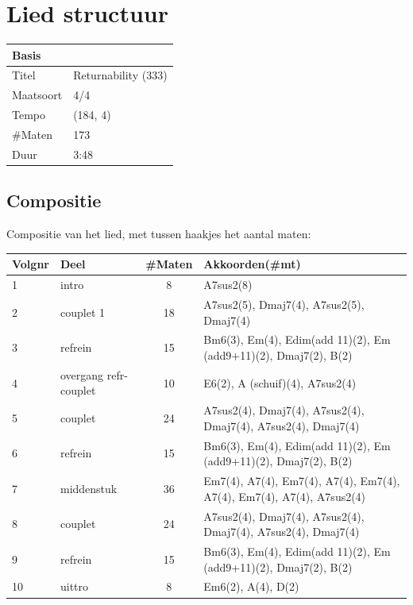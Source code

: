 \documentclass[a4paper,11pt]{article}
\begin{document}
\section*{Lied structuur}

\begin{tabular}{ll}
\hline
\textbf{Basis} & \\
\hline
Titel & Returnability (333) \\
Maatsoort & 4/4 \\
Tempo & (184, 4) \\
\#Maten & 173 \\
Duur & 3:48 \\
\hline
\end{tabular}

\vspace{0.5cm}

\subsection*{Compositie}

Compositie van het lied, met tussen haakjes het aantal maten:

\vspace{0.3cm}

\renewcommand{\arraystretch}{1.3}  %

\begin{tabular}{l|l|c|p{8cm}}
\hline
\textbf{Volgnr} & \textbf{Deel} & \textbf{\#Maten} & \textbf{Akkoorden(\#mt)} \\
\hline
1 & intro & 8 & A7sus2(8) \\
2 & couplet 1 & 18 & A7sus2(5), Dmaj7(4), A7sus2(5), Dmaj7(4) \\
3 & refrein & 15 & Bm6(3), Em(4), Edim(add 11)(2), Em (add9+11)(2), Dmaj7(2), B(2) \\
4 & overgang refr-couplet & 10 & E6(2), A (schuif)(4), A7sus2(4) \\
5 & couplet & 24 & A7sus2(4), Dmaj7(4), A7sus2(4), Dmaj7(4), A7sus2(4), Dmaj7(4) \\
6 & refrein & 15 & Bm6(3), Em(4), Edim(add 11)(2), Em (add9+11)(2), Dmaj7(2), B(2) \\
7 & middenstuk & 36 & Em7(4), A7(4), Em7(4), A7(4), Em7(4), A7(4), Em7(4), A7(4), A7sus2(4) \\
8 & couplet & 24 & A7sus2(4), Dmaj7(4), A7sus2(4), Dmaj7(4), A7sus2(4), Dmaj7(4) \\
9 & refrein & 15 & Bm6(3), Em(4), Edim(add 11)(2), Em (add9+11)(2), Dmaj7(2), B(2) \\
10 & uittro & 8 & Em6(2), A(4), D(2) \\
\hline
\end{tabular}
\end{document}
